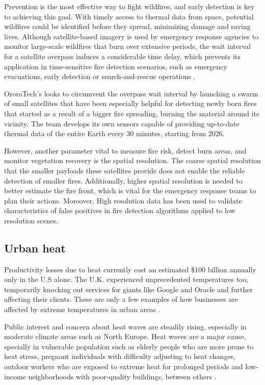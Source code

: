     Prevention is the most effective way to fight wildfires, and early detection is key to achieving this goal. 
    With timely access to thermal data from space, potential wildfires could be identified before they spread, minimizing damage and saving lives.
    Although satellite-based imagery is used by emergency response agencies to monitor large-scale wildfires that burn over extensive periods, the wait interval for a satellite overpass induces a considerable time delay, which prevents its application in time-sensitive fire detection scenarios, such as emergency evacuations, early detection or search-and-rescue operations \cite{lippitt2015time}. 

    OroraTech's looks to circumvent the overpass wait interval by launching a swarm of small satellites that have  been especially helpful for detecting newly born fires that started as a result of a bigger fire spreading, burning the material around its vicinity. The team develops its own sensors capable of providing up-to-date thermal data of the entire Earth every 30 minutes, starting from 2026.
    
    However, another parameter vital to measure fire risk, detect burn areas, and monitor vegetation recovery is the spatial resolution. The coarse spatial resolution that the smaller payloads these satellites provide does not enable the reliable detection of smaller fires. Additionally, higher spatial resolution is needed to better estimate the fire front, which is vital for the emergency response teams to plan their actions.
    Moreover, High resolution data has been used to validate characteristics of false positives in fire detection algorithms applied to low resolution scenes\cite{ijgi11120601}. 



    \subsection{Urban heat}

    Productivity losses due to heat currently cost an estimated \$100 billion annually only in the U.S alone.
    The U.K. experienced unprecedented temperatures too, temporarily knocking out services for giants like Google and Oracle and further affecting their clients.
    These are only a few examples of how businesses are affected by extreme temperatures in urban areas \cite{atlanticcouncil2021extreme}.  

    Public interest and concern about heat waves are steadily rising, especially in moderate climate areas such as North Europe. Heat waves are a major cause, specially in vulnerable population such as elderly people who are more prone to heat stress, pregnant individuals with difficulty adjusting to heat changes, outdoor workers who are exposed to extreme heat for prolonged periods and low-income neighborhoods with poor-quality buildings, between others \cite{Hsu2021Disproportionate}.   

